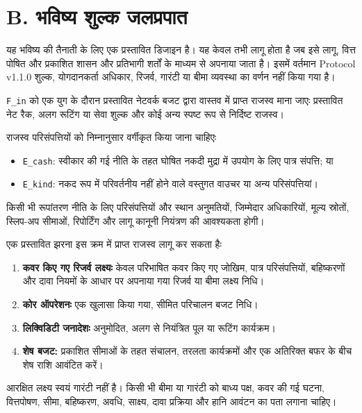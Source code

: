 \documentclass[11pt]{article}
\begin{document}
\section*{B. भविष्य शुल्क जलप्रपात}

यह भविष्य की तैनाती के लिए एक प्रस्तावित डिजाइन है। यह केवल तभी लागू होता है जब इसे लागू, वित्त पोषित और प्रकाशित शासन और प्रतिभागी शर्तों के माध्यम से अपनाया जाता है। इसमें वर्तमान Protocol v1.1.0 शुल्क, योगदानकर्ता अधिकार, रिजर्व, गारंटी या बीमा व्यवस्था का वर्णन नहीं किया गया है।

\texttt{F\_in} को एक युग के दौरान प्रस्तावित नेटवर्क बजट द्वारा वास्तव में प्राप्त राजस्व माना जाएः प्रस्तावित नेट रैक, अलग रूटिंग या सेवा शुल्क और कोई अन्य स्पष्ट रूप से निर्दिष्ट राजस्व।

राजस्व परिसंपत्तियों को निम्नानुसार वर्गीकृत किया जाना चाहिएः

\begin{itemize}[leftmargin=*]
\item \texttt{E\_cash}: स्वीकार की गई नीति के तहत घोषित नकदी मुद्रा में उपयोग के लिए पात्र संपत्ति; या
\item \texttt{E\_kind}: नकद रूप में परिवर्तनीय नहीं होने वाले वस्तुगत वाउचर या अन्य परिसंपत्तियां।
\end{itemize}
किसी भी रूपांतरण नीति के लिए परिसंपत्तियों और स्थान अनुमतियों, जिम्मेदार अधिकारियों, मूल्य स्रोतों, स्लिप-अप सीमाओं, रिपोर्टिंग और लागू कानूनी नियंत्रण की आवश्यकता होगी।

एक प्रस्तावित झरना इस क्रम में प्राप्त राजस्व लागू कर सकता हैः

\begin{enumerate}[leftmargin=*]
\item \textbf{कवर किए गए रिजर्व लक्ष्यः} केवल परिभाषित कवर किए गए जोखिम, पात्र परिसंपत्तियों, बहिष्करणों और दावा नियमों के आधार पर अपनाया गया रिजर्व या बीमा लक्ष्य निधि।
\item \textbf{कोर ऑपरेशनः} एक खुलासा किया गया, सीमित परिचालन बजट निधि।
\item \textbf{लिक्विडिटी जनादेशः} अनुमोदित, अलग से नियंत्रित पूल या रूटिंग कार्यक्रम।
\item \textbf{शेष बजट:} प्रकाशित सीमाओं के तहत संचालन, तरलता कार्यक्रमों और एक अतिरिक्त बफर के बीच शेष राशि आवंटित करें।
\end{enumerate}
आरक्षित लक्ष्य स्वयं गारंटी नहीं है। किसी भी बीमा या गारंटी को बाध्य पक्ष, कवर की गई घटना, वित्तपोषण, सीमा, बहिष्करण, अवधि, साक्ष्य, दावा प्रक्रिया और हानि आवंटन का पता लगाना चाहिए।
\end{document}

